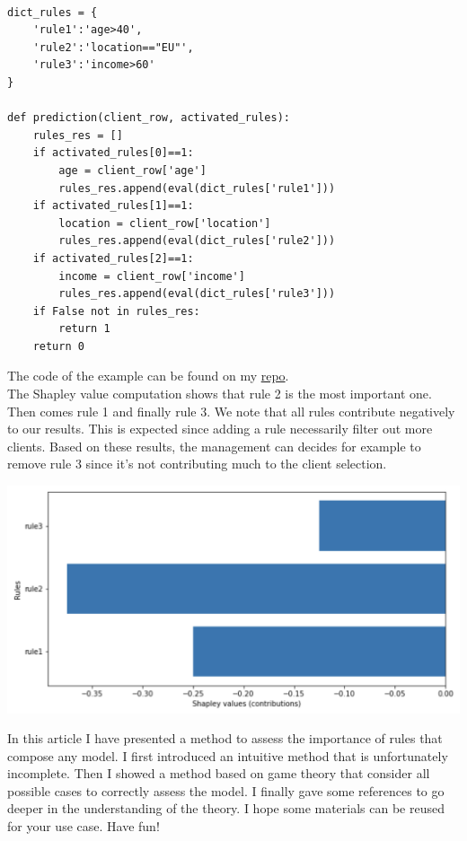 \lstset{language=Python}
\lstset{frame=lines}
\lstset{basicstyle=\footnotesize}
\begin{lstlisting}

dict_rules = {
    'rule1':'age>40',
    'rule2':'location=="EU"',
    'rule3':'income>60'
}

def prediction(client_row, activated_rules):
    rules_res = []
    if activated_rules[0]==1:
        age = client_row['age']
        rules_res.append(eval(dict_rules['rule1']))
    if activated_rules[1]==1:
        location = client_row['location']
        rules_res.append(eval(dict_rules['rule2']))
    if activated_rules[2]==1:
        income = client_row['income']
        rules_res.append(eval(dict_rules['rule3']))
    if False not in rules_res:
        return 1
    return 0

\end{lstlisting}

The code of the example can be found on my \href{}{repo}. \\

The Shapley value computation shows that rule 2 is the most important one. Then comes rule 1 and finally rule 3. We note that all rules contribute negatively to our results. This is expected since adding a rule necessarily filter out more clients. Based on these results, the management can decides for example to remove rule 3 since it's not contributing much to the client selection.

\begin{center}
\includegraphics[scale=0.6]{./../img/shapley-results.png}
\end{center}

In this article I have presented a method to assess the importance of rules that compose any model. I first introduced an intuitive method that is unfortunately incomplete. Then I showed a method based on game theory that consider all possible cases to correctly assess the model. I finally gave some references to go deeper in the understanding of the theory. I hope some materials can be reused for your use case. Have fun!


\vspace{10mm}